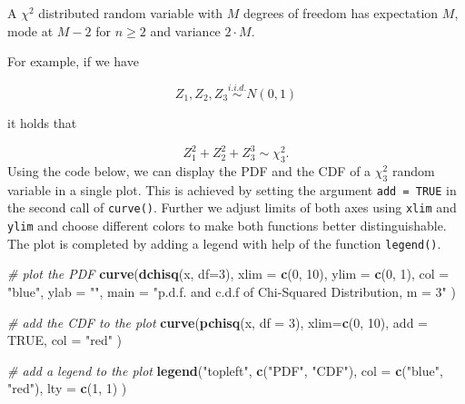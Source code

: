 \documentclass[]{book}
\newenvironment{Shaded}{\begin{snugshade}}{\end{snugshade}}
\newcommand{\KeywordTok}[1]{\textcolor[rgb]{0.13,0.29,0.53}{\textbf{#1}}}
\newcommand{\DataTypeTok}[1]{\textcolor[rgb]{0.13,0.29,0.53}{#1}}
\newcommand{\DecValTok}[1]{\textcolor[rgb]{0.00,0.00,0.81}{#1}}
\newcommand{\StringTok}[1]{\textcolor[rgb]{0.31,0.60,0.02}{#1}}
\newcommand{\CommentTok}[1]{\textcolor[rgb]{0.56,0.35,0.01}{\textit{#1}}}
\newcommand{\OtherTok}[1]{\textcolor[rgb]{0.56,0.35,0.01}{#1}}
\newcommand{\NormalTok}[1]{#1}
\theoremstyle{definition}
\theoremstyle{definition}
\theoremstyle{definition}
\theoremstyle{remark}
\begin{document}
A \(\chi^2\) distributed random variable with \(M\) degrees of freedom
has expectation \(M\), mode at \(M-2\) for \(n \geq 2\) and variance
\(2 \cdot M\).

For example, if we have

\[ Z_1,Z_2,Z_3 \overset{i.i.d.}{\sim} N(0,1) \]

it holds that

\[ Z_1^2+Z_2^2+Z_3^3 \sim \chi^2_3. \tag{2.3} \] Using the code below,
we can display the PDF and the CDF of a \(\chi^2_3\) random variable in
a single plot. This is achieved by setting the argument
\texttt{add = TRUE} in the second call of \texttt{curve()}. Further we
adjust limits of both axes using \texttt{xlim} and \texttt{ylim} and
choose different colors to make both functions better distinguishable.
The plot is completed by adding a legend with help of the function
\texttt{legend()}.

\begin{Shaded}
\begin{Highlighting}[]
\CommentTok{# plot the PDF}
\KeywordTok{curve}\NormalTok{(}\KeywordTok{dchisq}\NormalTok{(x, }\DataTypeTok{df=}\DecValTok{3}\NormalTok{), }
      \DataTypeTok{xlim =} \KeywordTok{c}\NormalTok{(}\DecValTok{0}\NormalTok{, }\DecValTok{10}\NormalTok{), }
      \DataTypeTok{ylim =} \KeywordTok{c}\NormalTok{(}\DecValTok{0}\NormalTok{, }\DecValTok{1}\NormalTok{), }
      \DataTypeTok{col =} \StringTok{"blue"}\NormalTok{,}
      \DataTypeTok{ylab =} \StringTok{""}\NormalTok{,}
      \DataTypeTok{main =} \StringTok{"p.d.f. and c.d.f of Chi-Squared Distribution, m = 3"}
\NormalTok{      )}

\CommentTok{# add the CDF to the plot}
\KeywordTok{curve}\NormalTok{(}\KeywordTok{pchisq}\NormalTok{(x, }\DataTypeTok{df =} \DecValTok{3}\NormalTok{), }
      \DataTypeTok{xlim=}\KeywordTok{c}\NormalTok{(}\DecValTok{0}\NormalTok{, }\DecValTok{10}\NormalTok{), }
      \DataTypeTok{add =} \OtherTok{TRUE}\NormalTok{, }
      \DataTypeTok{col =} \StringTok{"red"}
\NormalTok{      )}

\CommentTok{# add a legend to the plot}
\KeywordTok{legend}\NormalTok{(}\StringTok{"topleft"}\NormalTok{, }
       \KeywordTok{c}\NormalTok{(}\StringTok{"PDF"}\NormalTok{, }\StringTok{"CDF"}\NormalTok{), }
       \DataTypeTok{col =} \KeywordTok{c}\NormalTok{(}\StringTok{"blue"}\NormalTok{, }\StringTok{"red"}\NormalTok{), }
       \DataTypeTok{lty =} \KeywordTok{c}\NormalTok{(}\DecValTok{1}\NormalTok{, }\DecValTok{1}\NormalTok{)}
\NormalTok{       )}
\end{Highlighting}
\end{Shaded}
\end{document}
